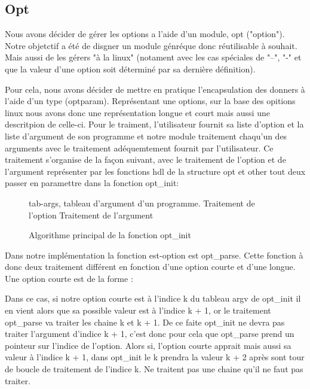 \documentclass[12pt]{article}
\renewcommand{\algorithmicwhile}{\textbf{Tant que}}
\begin{document}
        
        \subsection{Opt}

        Nous avons décider de gérer les options a l'aide d'un module, opt ("option"). Notre objetctif a été de disgner un module génréque donc réutilisable à souhait. Mais aussi de les gérers "à la linux" (notament avec les cas spéciales de "--", "-" et que la valeur d'une option soit déterminé par sa dernière définition). 

        Pour cela, nous avons décider de mettre en pratique l'encapsulation des 
        donners à l'aide d'un type (optparam). Représentant une options, sur la base des opitions linux nous avons donc une représentation longue et court mais aussi une descritpion de celle-ci. Pour le traiment, l'utilisateur fournit sa liste d'option et la liste d'argument de son programme et notre module traitement chaqu'un des arguments avec le traitement adéquemtement fournit par l'utilisateur. Ce traitement s'organise de la façon suivant, avec le traitement de l'option et de l'argument représenter par les fonctions hdl de la structure opt et other tout deux passer en paramettre dans la fonction opt\_init:\\

        \begin{figure}[ht]
            \renewcommand{\algorithmicwhile}{\textbf{Pour chaque}}
            \begin{algorithmic}
                \REQUIRE tab-args, tableau d'argument d'un programme.
                        \STATE Traitement de l'option
                    \ELSE
                         \STATE Traitement de l'argument
                    \ENDIF
                \ENDWHILE
            \end{algorithmic}
            \caption{Algorithme principal de la fonction opt\_init}
        \end{figure}

        Dans notre implémentation la fonction est-option est opt\_parse. Cette fonction à donc deux traitement différent en fonction d'une option courte et d'une longue. Une option courte est de la forme : 


        Dans ce cas, si notre option courte est à l'indice k du tableau argv de opt\_init il en vient alors que sa possible valeur est à l'indice k + 1, or le traitement opt\_parse va traiter les chaine k et k + 1. De ce faite opt\_init ne devra pas traiter l'argument d'indice k + 1, c'est donc pour cela que opt\_parse prend un pointeur sur l'indice de l'option. Alors si, l'option courte apprait mais aussi sa valeur à l'indice k + 1, dans opt\_init le k prendra la valeur k + 2 après sont tour de boucle de traitement de l'indice k. Ne traitent pas une chaine qu'il ne faut pas traiter.
\end{document}
